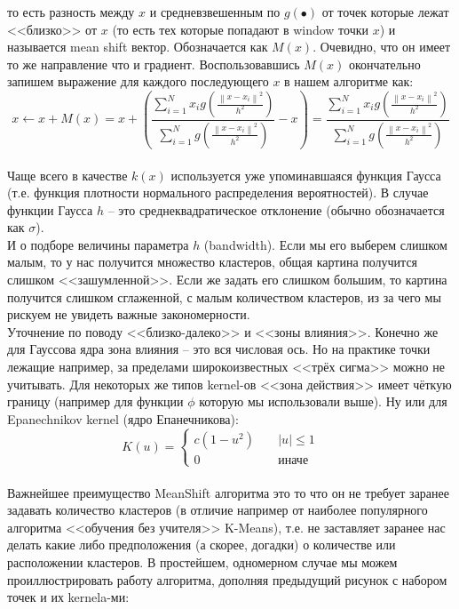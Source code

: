 \documentclass[11pt]{article}
\begin{document}
то есть разность между $x$ и средневзвешенным по $g(\bullet)$ от
точек которые лежат <<близко>> от $x$ (то есть тех которые попадают
в window точки $x$) и называется mean shift вектор. Обозначается как
$M(x)$. Очевидно, что он имеет то же направление что и градиент.
Воспользовавшись $M(x)$ окончательно запишем выражение для каждого
последующего $x$ в нашем алгоритме как:
$$
x \gets x + M(x) = x + \left(\frac{\sum\limits_{i = 1}^{N}x_i g\left(\frac{\left\|x - x_i\right\|^2}{h^2}\right)}{\sum\limits_{i = 1}^{N}g\left(\frac{\left\|x - x_i\right\|^2}{h^2}\right)} - x \right) = \frac{\sum\limits_{i = 1}^{N}x_i g\left(\frac{\left\|x - x_i\right\|^2}{h^2}\right)}{\sum\limits_{i = 1}^{N}g\left(\frac{\left\|x - x_i\right\|^2}{h^2}\right)}
$$
\\ Чаще всего в качестве $k(x)$ используется уже
упоминавшаяся функция Гаусса (т.е. функция плотности нормального
распределения вероятностей). В случае функции Гаусса $h$ -- это
среднеквадратическое отклонение (обычно обозначается как $\sigma$).
\\ И о подборе величины параметра $h$ (bandwidth). Если мы
его выберем слишком малым, то у нас получится множество кластеров, общая
картина получится слишком <<зашумленной>>. Если же задать его
слишком большим, то картина получится слишком сглаженной, с малым
количеством кластеров, из за чего мы рискуем не увидеть важные
закономерности. \\ Уточнение по поводу
<<близко-далеко>> и <<зоны влияния>>. Конечно же для Гауссова
ядра зона влияния -- это вся числовая ось. Но на практике точки лежащие
например, за пределами широкоизвестных <<трёх сигма>> можно не
учитывать. Для некоторых же типов kernel-ов <<зона действия>> имеет
чёткую границу (например для функции $\phi$ которую мы использовали
выше). Ну или для Epanechnikov kernel (ядро Епанечникова):
$$
K\left( u \right) = \left\lbrace
            \begin{aligned}
            c\left( 1 - u^2 \right) && \; |u| \le 1 && \\
            0 && \; \mbox{иначе} &&
           \end{aligned}
          \right.
$$
\\ Важнейшее преимущество MeanShift алгоритма это то что
он не требует заранее задавать количество кластеров (в отличие например
от наиболее популярного алгоритма <<обучения без учителя>>
K-Means), т.е. не заставляет заранее нас делать какие либо предположения
(а скорее, догадки) о количестве или расположении кластеров. В
простейшем, одномерном случае мы можем проиллюстрировать работу
алгоритма, дополняя предыдущий рисунок с набором точек и их kernela-ми:
\end{document}
